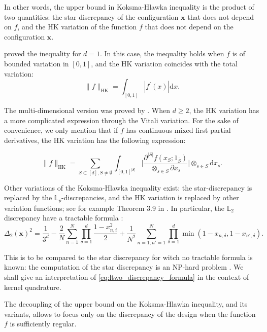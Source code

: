 \documentclass[twoside,11pt]{book}
\numberwithin{theorem}{chapter}
\numberwithin{definition}{chapter}
\numberwithin{proposition}{chapter}
\numberwithin{corollary}{chapter}
\numberwithin{example}{chapter}
\numberwithin{lemma}{chapter}
\begin{document}
In other words, the upper bound in Koksma-Hlawka inequality is the product of two quantities: the star discrepancy of the configuration $\bm{x}$ that does not depend on $f$, and the HK variation of the function $f$ that does not depend on the configuration $\bm{x}$. 

\cite{Kok42} proved the inequality for $d=1$. In this case, the inequality holds when $f$ is of bounded variation in $[0,1]$, and the HK variation coincides with the total variation:
\begin{equation}
\|f\|_{\mathrm{HK}} = \int_{[0,1]}|f^{'}(x)| \mathrm{d}x.
\end{equation}


The multi-dimensional version was proved by \cite{Hla61}. When $d \geq 2$, the HK variation has a more complicated expression through the Vitali variation. For the sake of convenience, we only mention that if $f$ has continuous mixed first partial derivatives, the HK variation has the following expression:

\begin{equation}
\|f\|_{\mathrm{HK}} = \sum\limits_{S \subset[d], S \neq \emptyset} \int_{[0,1]^{|S|}} \bigg|\frac{\partial^{|S|} f (x_S;1_{\bar{S}})}{\otimes_{s \in S}\partial x_{s}} \bigg| \otimes_{s \in S}\mathrm{d} x_{s}.
\end{equation}

Other variations of the Koksma-Hlawka inequality exist: the star-discrepancy is replaced by the $\mathbb{L}_{p}$-discrepancies, and the HK variation is replaced by other variation functions; see for example Theorem 3.9 in \citep{DiPi14}. In particular, the $\mathbb{L}_{2}$ discrepancy have a tractable formula \citep{War72}:
\begin{equation}\label{eq:ltwo_discrepancy_formula}
\Delta_{2}(\bm{x})^{2} = \frac{1}{3^{d}} - \frac{2}{N} \sum\limits_{n = 1}^{N} \prod\limits_{\delta=1}^{d} \frac{1-x_{n,i}^{2}}{2} + \frac{1}{N^2} \sum\limits_{n=1,n'=1}^{N} \prod\limits_{\delta=1}^{d} \min(1-x_{n,\delta},1-x_{n',\delta}).
\end{equation}

This is to be compared to the star discrepancy for witch no tractable formula is known: the computation of the star discrepancy is an NP-hard problem \citep{GnSrWi09}. We shall give an interpretation of \eqref{eq:ltwo_discrepancy_formula} in the context of kernel quadrature.

The decoupling of the upper bound on the Koksma-Hlawka inequality, and its variants, allows to focus only on the discrepancy of the design when the function $f$ is sufficiently regular.
\end{document}

